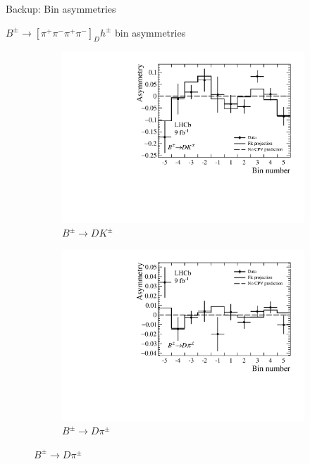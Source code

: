 \documentclass[xcolor={dvipsnames}]{beamer}
\begin{document}
\begin{frame}{Backup: Bin asymmetries}
  \begin{center}
    $B^\pm\to[\pi^+\pi^-\pi^+\pi^-]_Dh^\pm$ bin asymmetries
  \end{center}
  \begin{figure}
    \centering
    \begin{subfigure}{0.5\textwidth}
      \centering
      \includegraphics[width=1.0\textwidth]{Plots/BinAsymmetries_dk_pipipipi.pdf}
      \caption*{$B^\pm\to DK^\pm$}
    \end{subfigure}%
    \begin{subfigure}{0.5\textwidth}
      \centering
      \includegraphics[width=1.0\textwidth]{Plots/BinAsymmetries_dpi_pipipipi.pdf}
      \caption*{$B^\pm\to D\pi^\pm$}
    \end{subfigure}
  \end{figure}
\end{frame}
\end{document}
